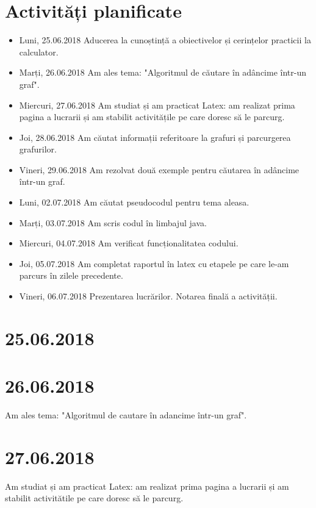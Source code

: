 \documentclass{report}
\begin{document}
\chapter{Activități planificate}
\begin{itemize}
\item  Luni, 25.06.2018 \newline
Aducerea la cunoștință a obiectivelor și cerințelor practicii la calculator.
\item  Marți, 26.06.2018 \newline
Am ales tema: "Algoritmul de căutare în adâncime într-un graf".
\item  Miercuri, 27.06.2018 \newline
Am studiat și am practicat Latex: am realizat prima pagina a lucrarii și am stabilit activitățile pe care doresc să le parcurg.
\item  Joi, 28.06.2018 \newline
Am căutat informații referitoare la grafuri și parcurgerea grafurilor.
\item  Vineri, 29.06.2018  \newline
Am rezolvat două exemple pentru căutarea în adâncime  într-un graf.
\item  Luni, 02.07.2018  \newline
Am căutat pseudocodul pentru tema aleasa.
\item  Marți, 03.07.2018  \newline
Am scris codul în limbajul java.
\item  Miercuri, 04.07.2018  \newline
Am verificat funcționalitatea codului. 
\item  Joi, 05.07.2018  \newline
Am completat raportul în latex cu etapele pe care le-am parcurs în zilele precedente.
\item  Vineri, 06.07.2018  \newline
Prezentarea lucrărilor.
Notarea finală a activității.
\end{itemize}
\chapter{25.06.2018}

\chapter{26.06.2018}
Am ales tema: "Algoritmul de cautare în adancime într-un graf".
\chapter{27.06.2018}
Am studiat și am practicat Latex: am realizat prima pagina a lucrarii și am stabilit activitătile pe care doresc să le parcurg.
\end{document}
